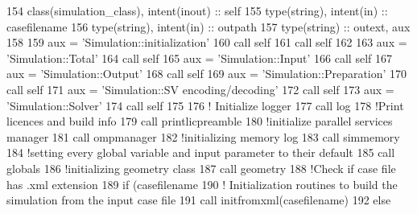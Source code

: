 \begin{DoxyCode}
154     \textcolor{keywordtype}{class}(simulation\_class), \textcolor{keywordtype}{intent(inout)} :: self
155     \textcolor{keywordtype}{type}(string), \textcolor{keywordtype}{intent(in)} :: casefilename
156     \textcolor{keywordtype}{type}(string), \textcolor{keywordtype}{intent(in)} :: outpath
157     \textcolor{keywordtype}{type}(string) :: outext, aux
158 
159     aux = \textcolor{stringliteral}{'Simulation::initialization'}
160     \textcolor{keyword}{call }self%
161     \textcolor{keyword}{call }self%
162 
163     aux = \textcolor{stringliteral}{'Simulation::Total'}
164     \textcolor{keyword}{call }self%
165     aux = \textcolor{stringliteral}{'Simulation::Input'}
166     \textcolor{keyword}{call }self%
167     aux = \textcolor{stringliteral}{'Simulation::Output'}
168     \textcolor{keyword}{call }self%
169     aux = \textcolor{stringliteral}{'Simulation::Preparation'}
170     \textcolor{keyword}{call }self%
171     aux = \textcolor{stringliteral}{'Simulation::SV encoding/decoding'}
172     \textcolor{keyword}{call }self%
173     aux = \textcolor{stringliteral}{'Simulation::Solver'}
174     \textcolor{keyword}{call }self%
175 
176     \textcolor{comment}{! Initialize logger}
177     \textcolor{keyword}{call }log%
178     \textcolor{comment}{!Print licences and build info}
179     \textcolor{keyword}{call }printlicpreamble
180     \textcolor{comment}{!initialize parallel services manager}
181     \textcolor{keyword}{call }ompmanager%
182     \textcolor{comment}{!initializing memory log}
183     \textcolor{keyword}{call }simmemory%
184     \textcolor{comment}{!setting every global variable and input parameter to their default}
185     \textcolor{keyword}{call }globals%
186     \textcolor{comment}{!initializing geometry class}
187     \textcolor{keyword}{call }geometry%
188     \textcolor{comment}{!Check if case file has .xml extension}
189     \textcolor{keywordflow}{if} (casefilename%
190         \textcolor{comment}{! Initialization routines to build the simulation from the input case file}
191         \textcolor{keyword}{call }initfromxml(casefilename)
192     \textcolor{keywordflow}{else}

\end{DoxyCode}
